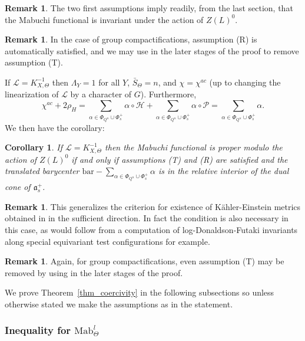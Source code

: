 \documentclass{amsart}
\newtheorem{cor}[thm]{Corollary}
\theoremstyle{definition}
\newtheorem{rem}[thm]{Remark}
\begin{document}
\begin{rem}
The two first assumptions imply readily, from the last section, that 
the Mabuchi functional is invariant under the action of 
$Z(L)^0$.
\end{rem}

\begin{rem}
In the case of group compactifications, assumption (R) 
is automatically satisfied, and we may use \cite{LZZ} in the 
later stages of the proof to remove assumption (T). 
\end{rem}

If $\mathcal{L}=K_{X,\Theta}^{-1}$ then 
$\Lambda_Y=1$ for all $Y$, $\bar{S}_{\Theta}=n$, and 
$\chi=\chi^{ac}$ (up to changing the linearization of 
$\mathcal{L}$ by a character of $G$).
Furthermore, 
\[
\chi^{ac}+2\rho_H= \sum_{\alpha\in \Phi_{Q^u}\cup\Phi_s^+}\alpha\circ\mathcal{H}
+\sum_{\alpha\in \Phi_{Q^u}\cup\Phi_s^+}\alpha\circ\mathcal{P}
=\sum_{\alpha\in \Phi_{Q^u}\cup\Phi_s^+}\alpha.
\]
We then have the corollary:

\begin{cor}
\label{cor_log}
If $\mathcal{L}=K_{X,\Theta}^{-1}$ 
then the Mabuchi functional is proper modulo the action 
of $Z(L)^0$ if and only if 
assumptions (T) and (R) are satisfied and the translated barycenter 
$
\mathrm{bar}-\sum_{\alpha\in \Phi_{Q^u}\cup\Phi_s^+}\alpha
$
is in the relative interior of the dual cone of $\mathfrak{a}_s^+$. 
\end{cor}

\begin{rem}
This generalizes the criterion for existence of Kähler-Einstein metrics 
obtained in \cite{DelKSSV} in the sufficient direction. In fact the 
condition is also necessary in this case, as would follow from a computation 
of log-Donaldson-Futaki invariants along special equivariant test configurations 
for example. 
\end{rem}

\begin{rem}
Again, for group compactifications, even assumption (T) 
may be removed by using \cite{LZZ} in the later stages of the 
proof.
\end{rem}

We prove Theorem~\ref{thm_coercivity} in the following subsections 
so unless otherwise stated we make the assumptions as in the statement. 

\subsubsection{Inequality for $\mathrm{Mab}^l_{\Theta}$}
\end{document}
